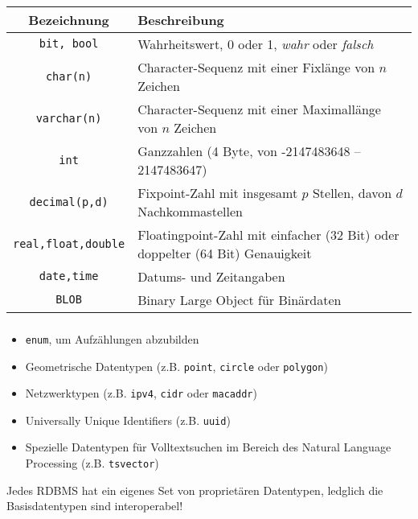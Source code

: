 \begin{frame}\frametitle{\insertsection}
	\framesubtitle{\insertsubsection}
	\begin{center}
		\begin{tabular}{|c|p{10cm}|}\hline
			 \small \textbf{Bezeichnung} & \small \textbf{Beschreibung} \\\hline
			\small\texttt{bit, bool} & \small Wahrheitswert, 0 oder 1, \textit{wahr} oder \textit{falsch}  \\\hline
			\small\texttt{char(n)} & \small Character-Sequenz mit einer Fixlänge von $n$ Zeichen  \\\hline
			\small\texttt{varchar(n)} & \small Character-Sequenz mit einer Maximallänge von $n$ Zeichen \\\hline
			\small\texttt{int}&\small Ganzzahlen (4 Byte, von -2147483648 -- 2147483647)\\\hline
			\small\texttt{decimal(p,d)}&\small Fixpoint-Zahl mit insgesamt $p$ Stellen, davon $d$ Nachkommastellen\\\hline
			\small\texttt{real,float,double}&\small Floatingpoint-Zahl mit einfacher (32 Bit) oder doppelter (64 Bit) Genauigkeit\\\hline
			\small\texttt{date,time}&\small Datums- und Zeitangaben\\\hline
			\small\texttt{BLOB}&\small Binary Large Object für Binärdaten\\\hline
		\end{tabular}
	\end{center}
\end{frame}

\begin{frame}\frametitle{\insertsection}
	\framesubtitle{\insertsubsection}
	\begin{itemize}
		\item \texttt{enum}, um Aufzählungen abzubilden
		\item Geometrische Datentypen (z.B. \texttt{point}, \texttt{circle} oder \texttt{polygon})
		\item Netzwerktypen (z.B. \texttt{ipv4}, \texttt{cidr} oder \texttt{macaddr})
		\item Universally Unique Identifiers (z.B. \texttt{uuid})
		\item Spezielle Datentypen für Volltextsuchen im Bereich des Natural Language Processing (z.B. \texttt{tsvector})
	\end{itemize}
\abs
Jedes RDBMS hat ein eigenes Set von proprietären Datentypen, ledglich die Basisdatentypen sind interoperabel!
\end{frame}

